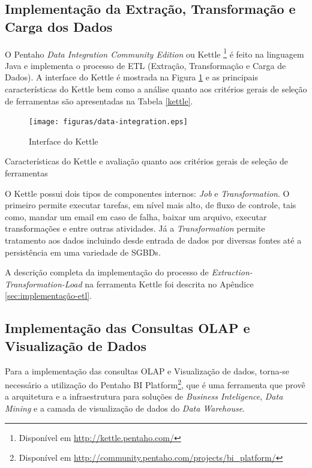 \subsection{Implementação da Extração, Transformação e Carga dos Dados}
\label{implementação-ETL}
O Pentaho \textit{Data Integration Community Edition} ou Kettle \footnote{Disponível em \url{http://kettle.pentaho.com/}} é feito na linguagem Java e implementa o processo de ETL (Extração, Transformação e Carga de Dados). A interface do Kettle é mostrada na Figura \ref{pdi} e as principais características do Kettle bem como a análise quanto aos critérios gerais de seleção de ferramentas são apresentadas na Tabela \ref{kettle}.

\begin{figure}[ht!]
\centering
\texttt{[image: figuras/data-integration.eps]}
\caption{Interface do Kettle}
\label{pdi}
\end{figure}
\FloatBarrier
 

\begin{table}[!ht]

\caption{Características do Kettle e avaliação quanto aos critérios gerais de seleção de ferramentas}
\label{kettle}
\end{table}
\FloatBarrier	

O Kettle possui dois tipos de componentes internos: \textit{Job} e \textit{Transformation}. O primeiro permite executar tarefas, em nível mais alto, de fluxo de controle, tais como, mandar um email em caso de falha, baixar um arquivo, executar transformações  e entre outras atividades. Já a \textit{Transformation} permite tratamento aos dados incluindo desde entrada de dados por diversas fontes até a persistência em uma variedade de SGBDs.


A descrição completa da implementação do processo de \textit{Extraction-Transformation-Load} na ferramenta Kettle foi descrita no Apêndice \ref{sec:implementação-etl}.

\subsection{Implementação das Consultas OLAP e Visualização de Dados}

Para a implementação das consultas OLAP e Visualização de dados, torna-se necessário a utilização do Pentaho BI Platform\footnote{Disponível em \url{http://community.pentaho.com/projects/bi_platform/}}, que é uma ferramenta que provê a arquitetura e a infraestrutura para soluções de \textit{Business Inteligence}, \textit{Data Mining} e a camada de visualização de dados do \textit{Data Warehouse}.


